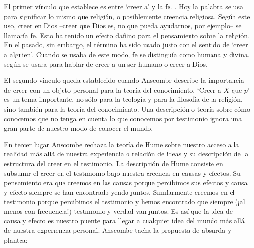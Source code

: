 El primer vínculo que establece es entre `creer a' y la fe. . Hoy la palabra se usa para significar lo mismo que religión, o
posiblemente creencia religiosa. Según este uso, creer en Dios --creer que Dios
es, no que pueda ayudarnos, por ejemplo-- se llamaría fe. Esto ha tenido un
efecto dañino para el pensamiento sobre la religión. En el pasado, sin embargo,
el término ha sido usado justo con el sentido de `creer a alguien'. Cuando se
usaba de este modo, fe se distinguía como humana y divina, según se usara para
hablar de creer a un ser humano o creer a Dios.

El segundo vínculo queda establecido cuando Anscombe describe la importancia de
creer con un objeto personal para la teoría del conocimiento. `Creer a $X$ que
$p$' es un tema importante, no sólo para la teología y para la filosofía de la
religión, sino también para la teoría del conocimiento. Una descripción o teoría
sobre cómo conocemos que no tenga en cuenta lo que conocemos por testimonio
ignora una gran parte de nuestro modo de conocer el mundo. 

En tercer lugar Anscombe rechaza la teoría de Hume sobre nuestro acceso a la
realidad más allá de nuestra experiencia o relación de ideas y su descripción de
la estructura del creer en el testimonio. La descripción de Hume consiste en
subsumir el creer en el testimonio bajo nuestra creencia en causas y efectos. Su
pensamiento era que creemos en las causas porque percibimos sus efectos y causa
y efecto siempre se han encontrado yendo juntos. Similarmente creemos en el
testimonio porque percibimos el testimonio y hemos encontrado que siempre (¡al
menos con frecuencia!) testimonio y verdad van juntos. Es así que la idea de
causa y efecto es nuestro puente para llegar a cualquier idea del mundo más allá
de nuestra experiencia personal. Anscombe tacha la propuesta de absurda y
plantea: 

